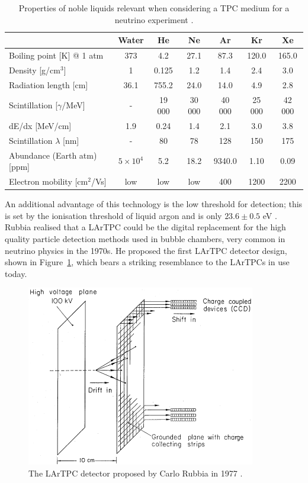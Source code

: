 \begin{table}
  \caption[Properties of noble liquids relevant when considering a TPC medium for a neutrino experiment.]{Properties of noble liquids relevant when considering a TPC medium for a neutrino experiment \cite{Soderberg2008}.}
  \label{tab:NobleProperties}
  \centering
  \begin{tabular}{ l c c c c c c }
    \toprule
     & Water & He & Ne & \color{red} Ar & Kr & Xe \\
    \midrule
    Boiling point [K] @ 1 atm & 373 & 4.2 & 27.1 & \color{red} 87.3 & 120.0 & 165.0 \\
    Density [g/cm$^3$] & 1 & 0.125 & 1.2 & \color{red} 1.4 & 2.4 & 3.0 \\
    Radiation length [cm] & 36.1 & 755.2 & 24.0 & \color{red} 14.0 & 4.9 & 2.8 \\
    Scintillation [$\gamma$/MeV] & - & 19 000 & 30 000 & \color{red} 40 000 & 25 000 & 42 000 \\
    dE/dx [MeV/cm] & 1.9 & 0.24 & 1.4 & \color{red} 2.1 & 3.0 & 3.8 \\
    Scintillation $\lambda$ [nm] & - & 80 & 78 & \color{red} 128 & 150 & 175 \\
    Abundance (Earth atm) [ppm] & $5\times 10^4$ & 5.2 & 18.2 & \color{red} 9340.0 & 1.10 & 0.09 \\
    Electron mobility [cm$^2$/Vs] & low & low & low & \color{red} 400 & 1200 & 2200 \\
    \bottomrule
  \end{tabular}
\end{table}

An additional advantage of this technology is the low threshold for detection; this is set by the ionisation threshold of liquid argon and is only $23.6 \pm 0.5$ eV \cite{Chepel2013}.  Rubbia realised that a LArTPC could be the digital replacement for the high quality particle detection methods used in bubble chambers, very common in neutrino physics in the 1970s.  He proposed the first LArTPC detector design, shown in Figure~\ref{fig:RubbiaLArTPC}, which bears a striking resemblance to the LArTPCs in use today.

\begin{figure}
  \centering
  \includegraphics[width=10cm]{RubbiaLArTPC.png}
  \caption[The LArTPC detector proposed by Carlo Rubbia in 1977.]{The LArTPC detector proposed by Carlo Rubbia in 1977 \cite{Rubbia1977}.}
  \label{fig:RubbiaLArTPC}
\end{figure}

